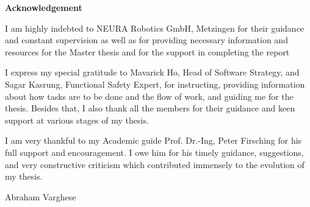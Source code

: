 \documentclass[12pt]{article}
\begin{document}
\newpage
\tableofcontents
\newpage
\listoffigures
{}
\newpage
\listoftables
{}
\newpage
\raggedright
\newpage
\raggedright
{}
\begin{center}
    \textbf{Acknowledgement}
\end{center}
    \raggedright

    I am highly indebted to NEURA Robotics GmbH, Metzingen for their guidance and constant supervision as well as for providing necessary information and resources for the Master thesis and for the support in completing the report

    \vspace{1cm}
    
    I express my special gratitude to Mavarick Ho, Head of Software Strategy, and Sagar Kasrung, Functional Safety Expert, for instructing, providing information about how tasks are to be done and the flow of work, and guiding me for the thesis. Besides that, I also thank all the members for their guidance and keen support at various stages of my thesis.

    \vspace{1cm}

    I am very thankful to my Academic guide  Prof. Dr.-Ing, Peter Firsching for his full support and encouragement. I owe him for his timely guidance, suggestions, and very constructive criticism which contributed immensely to the evolution of my thesis.
    
    \vspace{1.5 cm}
    
    \raggedleft
    Abraham Varghese
    


\newpage
\end{document}
